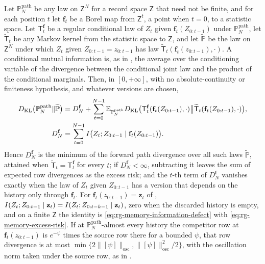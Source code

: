 Let $\mathbb P^{\mathrm{path}}_N$ be any law on $\mathsf Z^N$ for a record space
$\mathsf Z$ that need not be finite, and for each position $t$ let $\mathbf f_t$ be a
Borel map from $\mathsf Z^t$, a point when $t=0$, to a statistic space. Let
$\mathsf T^{\mathbf f}_t$ be a regular conditional law of $Z_t$ given
$\mathbf f_t(Z_{0:t-1})$ under $\mathbb P^{\mathrm{path}}_N$, let
$\widetilde{\mathsf T}_t$ be any Markov kernel from the statistic space to
$\mathsf Z$, and let $\widetilde{\mathbb P}$ be the law on $\mathsf Z^N$ under which
$Z_t$ given $Z_{0:t-1}=z_{0:t-1}$ has law
$\widetilde{\mathsf T}_t(\mathbf f_t(z_{0:t-1}),\cdot)$. A conditional mutual
information is, as in , the average over the
conditioning variable of the divergence between the conditional joint law and the
product of the conditional marginals. Then, in $[0,+\infty]$, with no
absolute-continuity or finiteness hypothesis, and whatever versions are chosen,
\begin{equation}
\begin{aligned}
D_{\mathrm{KL}}\bigl(\mathbb P^{\mathrm{path}}_N\Vert\widetilde{\mathbb P}\bigr)
&=D^{\mathbf f}_N+\sum_{t=0}^{N-1}\mathbb E_{\mathbb P^{\mathrm{path}}_N}
D_{\mathrm{KL}}\bigl(\mathsf T^{\mathbf f}_t(\mathbf f_t(Z_{0:t-1}),\cdot)\big\Vert
\widetilde{\mathsf T}_t(\mathbf f_t(Z_{0:t-1}),\cdot)\bigr),\\
D^{\mathbf f}_N&=\sum_{t=0}^{N-1}I\bigl(Z_t;Z_{0:t-1}\mid\mathbf f_t(Z_{0:t-1})\bigr).
\end{aligned}
\label{eq:rg-memory-borel-identity}
\end{equation}
Hence $D^{\mathbf f}_N$ is the minimum of the forward path divergence over all such
laws $\widetilde{\mathbb P}$, attained when $\widetilde{\mathsf T}_t=\mathsf T^{\mathbf f}_t$
for every $t$; if $D^{\mathbf f}_N<\infty$, subtracting it leaves the sum of expected
row divergences as the excess risk; and the $t$-th term of $D^{\mathbf f}_N$ vanishes
exactly when the law of $Z_t$ given $Z_{0:t-1}$ has a version that depends on the
history only through $\mathbf f_t$. For $\mathbf f_t(z_{0:t-1})=\mathbf z_t$ of
,
$I(Z_t;Z_{0:t-1}\mid\mathbf z_t)=I(Z_t;Z_{0:t-k-1}\mid\mathbf z_t)$, zero when the
discarded history is empty, and on a finite $\mathsf Z$ the identity is
\eqref{eq:rg-memory-information-defect} with \eqref{eq:rg-memory-excess-risk}. If at
$\mathbb P^{\mathrm{path}}_N$-almost every history the competitor row at
$\mathbf f_t(z_{0:t-1})$ is $e^{-\psi}$ times the source row there for a bounded
$\psi$, that row divergence is at most
$\min\{2\lVert[\psi]\rVert_{\mathrm{osc}},\lVert[\psi]\rVert_{\mathrm{osc}}^2/2\}$, with
the oscillation norm taken under the source row, as in
. 

